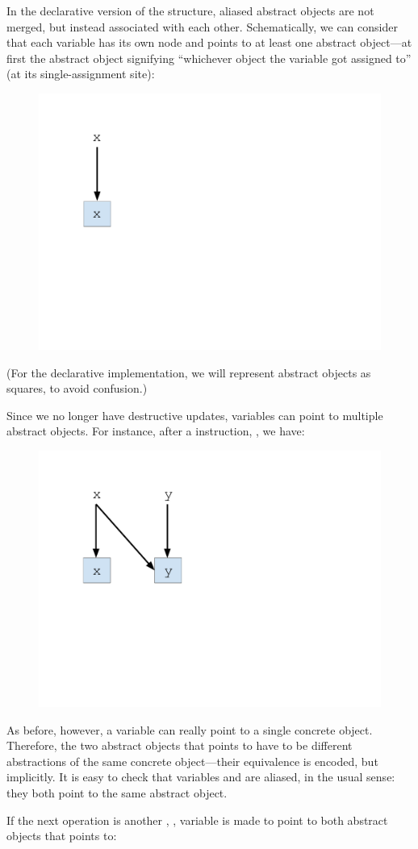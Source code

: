 In the declarative version of the structure, aliased abstract objects are not merged, but instead associated with each other. Schematically, we can consider that each variable has its own node and points to at least one abstract object---at first the abstract object signifying ``whichever object the variable got assigned to'' (at its single-assignment site):

\begin{figure}[ht]
\centering
\includegraphics[trim={25mm 90mm 190mm 25mm},clip,width=0.15\linewidth]{assets/must-data/decl-alias-graph0.pdf}
\end{figure}

(For the declarative implementation, we will represent abstract objects as squares, to avoid confusion.)

Since we no longer have destructive updates, variables can point to multiple abstract objects. For instance, after a  instruction, , we have:

\begin{figure}[ht]
\centering
\includegraphics[trim={30mm 90mm 140mm 25mm},clip,width=0.32\linewidth]{assets/must-data/decl-alias-graph1.pdf}
\end{figure}

As before, however, a variable can really point to a single concrete object. Therefore, the two abstract objects that  points to have to be different abstractions of the same concrete object---their equivalence is encoded, but implicitly. It is easy to check that variables  and  are aliased, in the usual sense: they both point to the same abstract object.

If the next operation is another , , variable  is made to point to both abstract objects that  points to:

